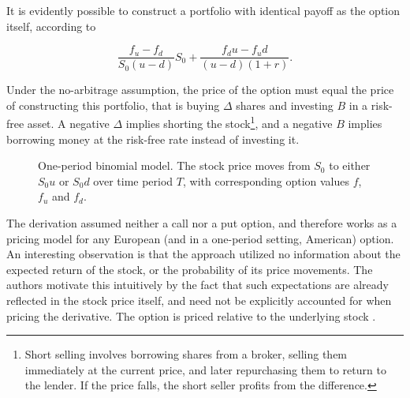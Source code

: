 \documentclass[english,12pt,a4paper,pdftex,sci,utf8]{aaltothesis}
\begin{document}
It is evidently possible to construct a portfolio with identical payoff as the option itself, according to

\begin{equation}
     \frac{f_u - f_d}{S_0(u-d)} S_0 + \frac{f_du-f_ud}{(u-d)(1+r)}
\label{eq:replicating-portfolio}.
\end{equation}

Under the no-arbitrage assumption, the price of the option must equal the price of constructing this portfolio, that is buying $\Delta$ shares and investing $B$ in a risk-free asset. A negative $\Delta$ implies shorting the stock\footnote{Short selling involves borrowing shares from a broker, selling them immediately at the current price, and later repurchasing them to return to the lender. If the price falls, the short seller profits from the difference.}, and a negative $B$ implies borrowing money at the risk-free rate instead of investing it.
\begin{figure}[htbp]
    \centering
    \caption{One-period binomial model. The stock price moves from $S_0$ to either $S_0u$ or $S_0d$ over time period $T$, with corresponding option values $f$, $f_u$ and $f_d$.}
    \label{fig:oneperiodbinom}
\end{figure}

The derivation assumed neither a call nor a put option, and therefore works as a pricing model for any European (and in a one-period setting, American) option. An interesting observation is that the approach utilized no information about the expected return of the stock, or the probability of its price movements. The authors motivate this intuitively by the fact that such expectations are already reflected in the stock price itself, and need not be explicitly accounted for when pricing the derivative. The option is priced relative to the underlying stock \cite{hull2016options}.\clearpage
\end{document}
